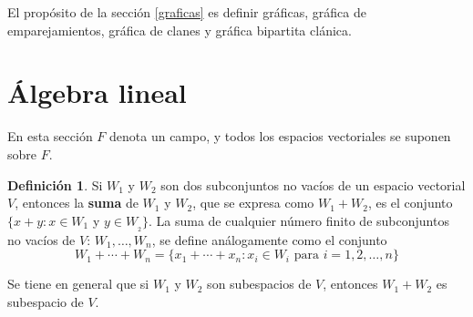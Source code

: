 \documentclass[12pt]{book}
\newtheorem{theorem}{Teorema}[section]
\theoremstyle{definition}
\newtheorem{definition}[theorem]{Definición}
\newcounter{in}
\newcounter{ini}
\begin{document}
El propósito de la sección \ref{graficas} es definir gráficas,
gráfica de emparejamientos, gráfica de clanes y gráfica bipartita
clánica.


\section{Álgebra lineal}
\label{esp-vec}

En esta sección $F$ denota un campo, y todos los espacios vectoriales
se suponen sobre $F$.


\begin{definition}
  Si $W_{1}$ y $W_{2}$ son dos subconjuntos no vacíos de un espacio
  vectorial $V$, entonces la \textbf{suma} de $W_{1}$ y $W_{2}$, que se
  expresa como $W_{1}+W_{2}$, es el conjunto $\{x+y:x\in W_{1}$ y $y\in
  W_{_2}\}$. La suma de cualquier número finito de subconjuntos no
  vacíos de $V$: $W_{1},\ldots,W_{n}$, se define análogamente como el
  conjunto
  $$W_{1}+\cdots+W_{n}=\{x_{1}+\cdots+x_{n}: x_{i}\in W_{i} \mbox{ para }i=1,2,\ldots,n\}$$
\end{definition}

Se tiene en general que si $W_{1}$ y $W_{2}$ son subespacios de $V$,
entonces $W_{1}+W_{2}$ es subespacio de $V$.
\end{document}
